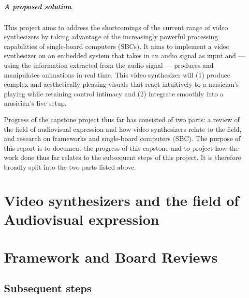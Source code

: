 \documentclass{report}
\begin{document}
\paragraph{A proposed solution}
This project aims to address the shortcomings of the current range of video synthesizers by taking advantage of the increasingly powerful processing capabilities of single-board computers (SBCs). It aims to implement a video synthesizer on an embedded system that takes in an audio signal as input and --- using the information extracted from the audio signal --- produces and manipulates animations in real time. This video synthesizer will (1) produce complex and aesthetically pleasing visuals that react intuitively to a musician's playing while retaining control intimacy and (2) integrate smoothly into a musician's live setup. \par %

Progress of the capstone project thus far has consisted of two parts: a review of the field of audiovisual expression and how video synthesizers relate to the field, and research on frameworks and single-board computers (SBC). The purpose of this report is to document the progress of this capstone and to project how the work done thus far relates to the subsequent steps of this project. It is therefore broadly split into the two parts listed above.

\chapter{Video synthesizers and the field of Audiovisual expression}



\chapter{Framework and Board Reviews}



\section*{Subsequent steps}
\markright{}
\end{document}
